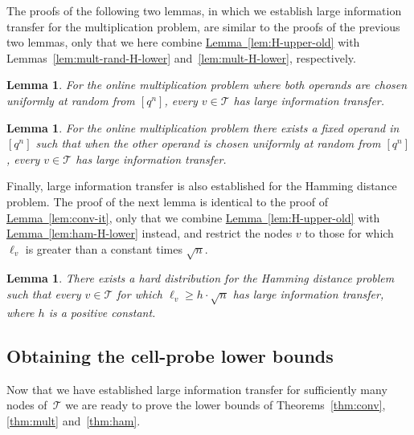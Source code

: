 \documentclass[11pt]{article}
\numberwithin{equation}{section}
\newtheorem{lemma}[theorem]{Lemma}
\theoremstyle{definition}
\theoremstyle{plain}
\newcommand{\expref}[2]{\hyperref[#2]{#1~\ref{#2}}}
\newcommand{\calT}{\ensuremath{\mathcal{T}}}
\newcommand{\lit}{large information transfer\xspace}
\begin{document}
The proofs of the following two lemmas, in which we establish large information transfer for the multiplication problem, are similar to the proofs of the previous two lemmas, only that we here combine \expref{Lemma}{lem:H-upper-old} with Lemmas~\ref{lem:mult-rand-H-lower} and~\ref{lem:mult-H-lower}, respectively.

\begin{lemma}
	\label{lem:mult-random-it}
	For the online multiplication problem where both operands are chosen uniformly at random from $[q^n]$, every $v\in\calT$ has \lit.
\end{lemma}

\begin{lemma}
	\label{lem:mult-it}
	For the online multiplication problem there exists a fixed operand in $[q^n]$ such that when the other operand is chosen uniformly at random from $[q^n]$, every $v\in\calT$ has \lit.
\end{lemma}

Finally, large information transfer is also established for the Hamming distance problem. The proof of the next lemma is identical to the proof of \expref{Lemma}{lem:conv-it}, only that we
combine \expref{Lemma}{lem:H-upper-old} with \expref{Lemma}{lem:ham-H-lower} instead, and
restrict the nodes $v$ to those for which $\ell_v$ is greater than a constant times $\sqrt{n}$.

\begin{lemma}
	\label{lem:ham-it}
	There exists a hard distribution for the Hamming distance problem such that every $v\in\calT$ for which $\ell_v\geq h \cdot \sqrt{n}$ has \lit, where $h$ is a positive constant.
\end{lemma}


\subsection{Obtaining the cell-probe lower bounds}\label{sec:entropyconc}

Now that we have established \lit for sufficiently many nodes of~$\calT$ we are ready to prove the lower bounds of Theorems~\ref{thm:conv}, \ref{thm:mult} and~\ref{thm:ham}.
\end{document}

